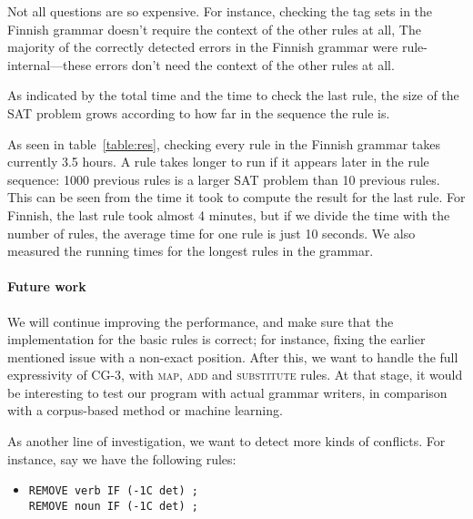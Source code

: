 Not all questions are so expensive.
For instance, checking the tag sets in the Finnish grammar doesn't require the context of the other rules at all,
 The majority of the correctly detected errors in the Finnish grammar were rule-internal---these errors don't need the context of the other rules at all.


As indicated by the total time and the time to check the last rule, the size of the SAT problem grows according to how far in the sequence the rule is.

As seen in table~\ref{table:res}, checking every rule in the Finnish grammar takes currently 3.5 hours.
A rule takes longer to run if it appears later in the rule sequence: 1000 previous rules is a larger SAT problem than 10 previous rules.
This can be seen from the time it took to compute the result for the last rule. For Finnish, the last rule took almost 4 minutes, but if we divide the time with the number of rules, the average time for one rule is just 10 seconds.
We also measured the running times for the longest rules in the grammar.


\paragraph{Future work} We will continue improving the performance, and make sure that the implementation for the basic rules is correct; for instance, fixing the earlier mentioned issue with a non-exact position.
After this, we want to handle the full expressivity of CG-3, with \textsc{map}, \textsc{add} and \textsc{substitute} rules.
At that stage, it would be interesting to test our program with actual grammar writers,
in comparison with a corpus-based method or machine learning.

As another line of investigation, we want to detect more kinds of conflicts.
For instance, say we have the following rules:

\begin{itemize}
\item[] \begin{verbatim}
REMOVE verb IF (-1C det) ;
REMOVE noun IF (-1C det) ;
\end{verbatim}
\end{itemize}

